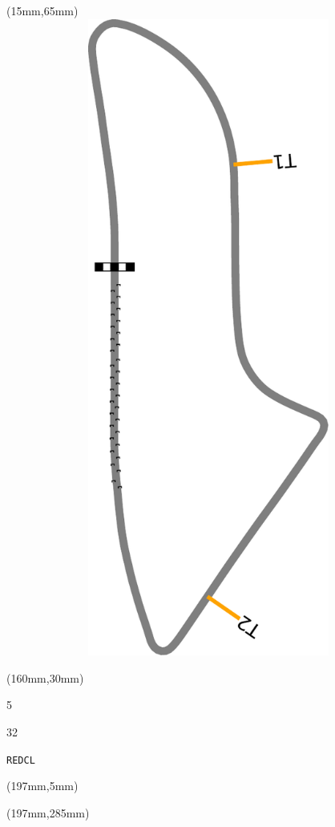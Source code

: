 \begin{textblock*}{185mm}(15mm,65mm)%
\centering
\mbox{\includegraphics[width=185mm,height=210mm,keepaspectratio]{PT/REDCL.pdf}}
\end{textblock*}
\begin{textblock*}{40mm}(160mm,30mm)%
\Large
\par{} 
\par5 
\par32 
\par\hfill\tiny\tt REDCL\\
\end{textblock*}
\begin{textblock*}{20mm}(197mm,5mm)%
\fbox{\thepage}
\label{REDCL}
\end{textblock*}
\begin{textblock*}{20mm}(197mm,285mm)%
\fbox{\thepage}
\end{textblock*}

